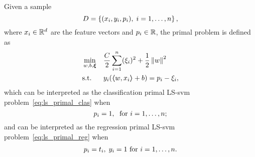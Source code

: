 \begin{definition}
    Given a sample
    $$ D = \left\{(x_i, y_i, p_i), \; i=1, \ldots, n\right\} ,$$
    where $x_i \in \mathbb{R}^d$ are the feature vectors and $p_i \in \mathbb{R}$, 
    the primal problem is defined as
    \begin{equation}
        \label{eq:ls_primal}
        \begin{aligned}
            &\min_{w, b, \fv{\xi}} & & \frac{C}{2} \sum_{i=1}^\nsamples (\xi_i)^2 + \frac{1}{2} \norm{w}^2 \\
            & \text{s.t.} & & y_i (\dotp{w}{x_i} + b) = p_i - \xi_i ,     
        \end{aligned}  
    \end{equation}
    which can be interpreted as the classification primal LS-\acrshort{svm} problem~\eqref{eq:ls_primal_clas} when
    $$ p_i = 1,\; \text{ for } i=1, \ldots, n ;$$
    and can be interpreted as the regression primal LS-\acrshort{svm} problem~\eqref{eq:ls_primal_reg} when
    \begin{equation}
        \nonumber
        \begin{aligned}
            p_i = t_i  ,\; y_i = 1 \text{ for } i=1, \ldots, n . \\
        \end{aligned}
    \end{equation}
\end{definition}
%
